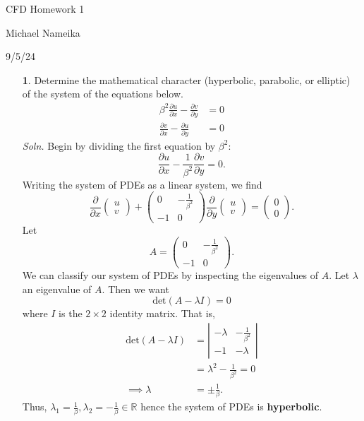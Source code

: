 \documentclass{article}
\begin{document}
\begin{center}
    {\huge CFD Homework 1}
    \vspace{0.5cm}

    {\Large Michael Nameika}
    \vspace{0.33cm}

    {\large 9/5/24}
\end{center}

\begin{itemize}
    \item[\textbf{1}.] Determine the mathematical character (hyperbolic, parabolic, or elliptic) of the system of the equations below.
    \begin{align*}
        \beta^2\frac{\partial u}{\partial x} - \frac{\partial v}{\partial y} &= 0\\
        \frac{\partial v}{\partial x} - \frac{\partial u}{\partial y} &= 0
    \end{align*}
    \textit{Soln.} Begin by dividing the first equation by $\beta^2$:
    \[\frac{\partial u}{\partial x} - \frac{1}{\beta^2}\frac{\partial v}{\partial y} = 0.\]
    Writing the system of PDEs as a linear system, we find
    \[\frac{\partial }{\partial x} \begin{pmatrix}
        u\\
        v
    \end{pmatrix} + \begin{pmatrix}
        0 & -\frac{1}{\beta^2}\\
        -1 & 0
    \end{pmatrix}\frac{\partial}{\partial y}\begin{pmatrix}
        u\\
        v
    \end{pmatrix} = \begin{pmatrix}
        0\\
        0
    \end{pmatrix}.\]
    Let 
    \[A = \begin{pmatrix}
        0 & -\frac{1}{\beta^2}\\
        -1 & 0
    \end{pmatrix}.\]
    We can classify our system of PDEs by inspecting the eigenvalues of $A$. Let $\lambda$ an eigenvalue of $A$. Then we want
    \[\text{det}(A - \lambda I) = 0\]
    where $I$ is the $2 \times 2$ identity matrix. That is,
    \begin{align*}
        \text{det}(A - \lambda I) &= \left|\begin{matrix}
            -\lambda & -\frac{1}{\beta^2}\\
            -1 & -\lambda
        \end{matrix}\right|\\
        &= \lambda^2 - \frac{1}{\beta^2} = 0\\
        \implies \lambda &= \pm \frac{1}{\beta}.
    \end{align*}
    Thus, $\lambda_1 = \frac{1}{\beta}, \lambda_2 = -\frac{1}{\beta} \in \mathbb{R}$ hence the system of PDEs is \textbf{hyperbolic}.
\pagebreak



\end{itemize}
\end{document}
